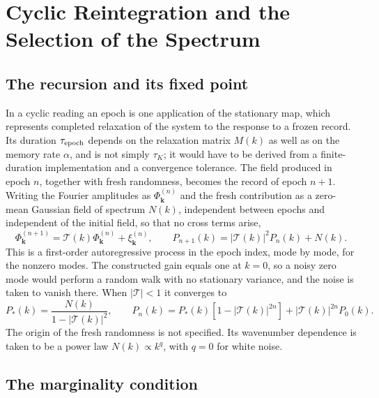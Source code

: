 \documentclass[11pt]{article}
\theoremstyle{definition}
\theoremstyle{remark}
\newcommand{\TT}{\mathcal{T}}
\begin{document}
\section{Cyclic Reintegration and the Selection of the Spectrum}\label{sec:recursion}

\subsection{The recursion and its fixed point}

In a cyclic reading an epoch is one application of the stationary map, which represents completed relaxation of the system to the response to a frozen record. Its duration $\tau_{\rm epoch}$ depends on the relaxation matrix $M(k)$ as well as on the memory rate $\alpha$, and is not simply $\tau_K$; it would have to be derived from a finite-duration implementation and a convergence tolerance. The field produced in epoch $n$, together with fresh randomness, becomes the record of epoch $n+1$. Writing the Fourier amplitudes as $\Phi^{(n)}_{\mathbf k}$ and the fresh contribution as a zero-mean Gaussian field of spectrum $N(k)$, independent between epochs and independent of the initial field, so that no cross terms arise,
\begin{equation}
\Phi^{(n+1)}_{\mathbf k}=\TT(k)\Phi^{(n)}_{\mathbf k}+\xi^{(n)}_{\mathbf k},\qquad P_{n+1}(k)=|\TT(k)|^2P_n(k)+N(k).
\end{equation}
This is a first-order autoregressive process in the epoch index, mode by mode, for the nonzero modes. The constructed gain equals one at $k=0$, so a noisy zero mode would perform a random walk with no stationary variance, and the noise is taken to vanish there. When $|\TT|<1$ it converges to
\begin{equation}
P_*(k)=\frac{N(k)}{1-|\TT(k)|^2},\qquad P_n(k)=P_*(k)\left[1-|\TT(k)|^{2n}\right]+|\TT(k)|^{2n}P_0(k).
\label{eq:fixed}
\end{equation}
The origin of the fresh randomness is not specified. Its wavenumber dependence is taken to be a power law $N(k)\propto k^q$, with $q=0$ for white noise.

\subsection{The marginality condition}
\end{document}
